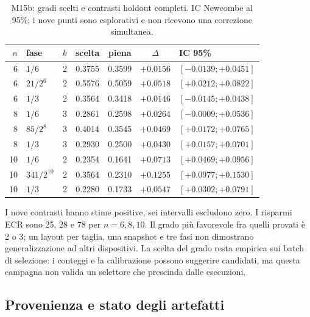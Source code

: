 \begin{table}[!htbp]
\centering
\footnotesize
\setlength{\tabcolsep}{3pt}
\caption{M15b: gradi scelti e contrasti holdout completi.
IC Newcombe al 95\%; i nove punti sono esplorativi e non
ricevono una correzione simultanea.}
\label{tab:aqft_qpe_completa}
\begin{tabular}{rlrcccl}
\toprule
$n$ & fase & $k$ & scelta & piena & $\Delta$ & IC 95\% \\
\midrule
6 & $1/6$ & 2 & 0.3755 & 0.3599 & $+0.0156$ & $[-0.0139;+0.0451]$ \\
6 & $21/2^6$ & 2 & 0.5576 & 0.5059 & $+0.0518$ & $[+0.0212;+0.0822]$ \\
6 & $1/3$ & 2 & 0.3564 & 0.3418 & $+0.0146$ & $[-0.0145;+0.0438]$ \\
8 & $1/6$ & 3 & 0.2861 & 0.2598 & $+0.0264$ & $[-0.0009;+0.0536]$ \\
8 & $85/2^8$ & 3 & 0.4014 & 0.3545 & $+0.0469$ & $[+0.0172;+0.0765]$ \\
8 & $1/3$ & 3 & 0.2930 & 0.2500 & $+0.0430$ & $[+0.0157;+0.0701]$ \\
10 & $1/6$ & 2 & 0.2354 & 0.1641 & $+0.0713$ & $[+0.0469;+0.0956]$ \\
10 & $341/2^{10}$ & 2 & 0.3564 & 0.2310 & $+0.1255$ & $[+0.0977;+0.1530]$ \\
10 & $1/3$ & 2 & 0.2280 & 0.1733 & $+0.0547$ & $[+0.0302;+0.0791]$ \\
\bottomrule
\end{tabular}
\end{table}

I nove contrasti hanno stime positive, sei intervalli escludono zero.
I risparmi ECR sono 25, 28 e 78 per $n=6,8,10$.
Il grado più favorevole fra quelli provati è 2 o 3; un layout per taglia,
una snapshot e tre fasi non dimostrano generalizzazione ad altri dispositivi.
La scelta del grado resta empirica sui batch di selezione: i conteggi e
la calibrazione possono suggerire candidati, ma questa campagna non valida
un selettore che prescinda dalle esecuzioni.

\subsection{Provenienza e stato degli artefatti}

